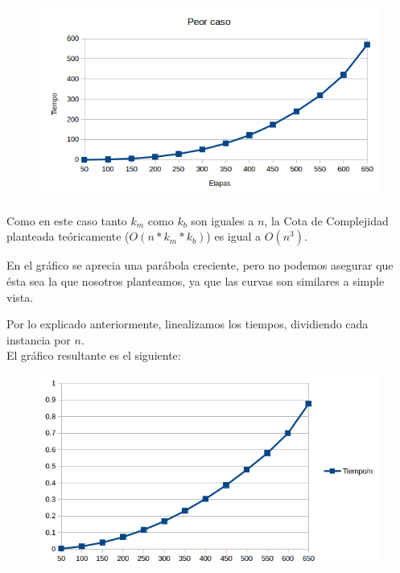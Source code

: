   \begin{figure}[h!]
   \begin{center}
	\includegraphics[scale=0.8]{imagenes/ej1/peorCaso1.png}
   \end{center}
  \end{figure}
  
  Como en este caso tanto $k_m$ como $k_b$ son iguales a $n$, la Cota de Complejidad planteada te\'oricamente ($O(n* k_m* k_b)$) es igual a $O(n^3)$.
  
  En el gr\'afico se aprecia una par\'abola creciente, pero no podemos asegurar que \'esta sea la que nosotros planteamos, ya que las curvas son similares a simple vista.

      \newpage
      
        Por lo explicado anteriormente, linealizamos los tiempos, dividiendo cada instancia por $n$.\\
        
  El gr\'afico resultante es el siguiente:
  
  \begin{figure}[h!]
   \begin{center}
	\includegraphics[scale=0.8]{imagenes/ej1/peorCaso2.png}
   \end{center}
  \end{figure}
  

